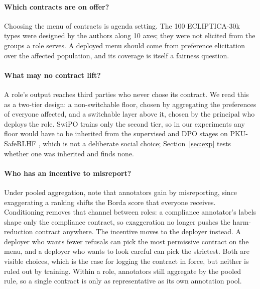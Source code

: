\documentclass[letterpaper]{article} %
\begin{document}
\paragraph{Which contracts are on offer?}
Choosing the menu of contracts is agenda setting. The 100 ECLIPTICA-30k types were designed by the authors along 10 axes; they were not elicited from the groups a role serves. A deployed menu should come from preference elicitation over the affected population, and its coverage is itself a fairness question.

\paragraph{What may no contract lift?}
A role's output reaches third parties who never chose its contract. We read this as a two-tier design: a non-switchable floor, chosen by aggregating the preferences of everyone affected, and a switchable layer above it, chosen by the principal who deploys the role. SwiPO trains only the second tier, so in our experiments any floor would have to be inherited from the supervised and DPO stages on PKU-SafeRLHF \cite{ji2024pku}, which is not a deliberate social choice; Section~\ref{sec:exp} tests whether one was inherited and finds none.

\paragraph{Who has an incentive to misreport?}
Under pooled aggregation, \citet{siththaranjan2024distributional} note that annotators gain by misreporting, since exaggerating a ranking shifts the Borda score that everyone receives. Conditioning removes that channel between roles: a compliance annotator's labels shape only the compliance contract, so exaggeration no longer pushes the harm-reduction contract anywhere. The incentive moves to the deployer instead. A deployer who wants fewer refusals can pick the most permissive contract on the menu, and a deployer who wants to look careful can pick the strictest. Both are visible choices, which is the case for logging the contract in force, but neither is ruled out by training. Within a role, annotators still aggregate by the pooled rule, so a single contract is only as representative as its own annotation pool.
\end{document}
